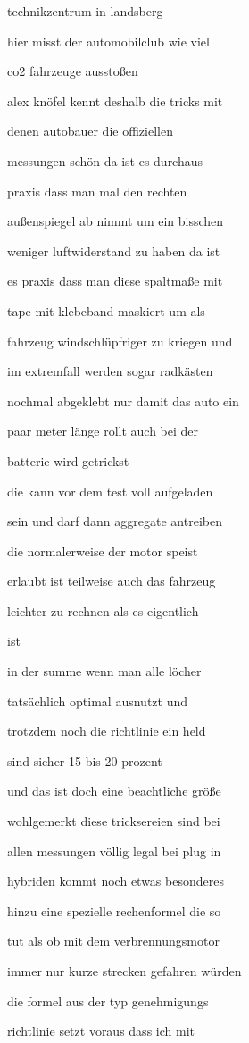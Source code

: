 \documentclass[a4paper, 11pt]{book} %
\begin{document}
technikzentrum in landsberg

hier misst der automobilclub wie viel

co2 fahrzeuge ausstoßen

alex knöfel kennt deshalb die tricks mit

denen autobauer die offiziellen

messungen schön da ist es durchaus

praxis dass man mal den rechten

außenspiegel ab nimmt um ein bisschen

weniger luftwiderstand zu haben da ist

es praxis dass man diese spaltmaße mit

tape mit klebeband maskiert um als

fahrzeug windschlüpfriger zu kriegen und

im extremfall werden sogar radkästen

nochmal abgeklebt nur damit das auto ein

paar meter länge rollt auch bei der

batterie wird getrickst

die kann vor dem test voll aufgeladen

sein und darf dann aggregate antreiben

die normalerweise der motor speist

erlaubt ist teilweise auch das fahrzeug

leichter zu rechnen als es eigentlich

ist

in der summe wenn man alle löcher

tatsächlich optimal ausnutzt und

trotzdem noch die richtlinie ein held

sind sicher 15 bis 20 prozent

und das ist doch eine beachtliche größe

wohlgemerkt diese tricksereien sind bei

allen messungen völlig legal bei plug in

hybriden kommt noch etwas besonderes

hinzu eine spezielle rechenformel die so

tut als ob mit dem verbrennungsmotor

immer nur kurze strecken gefahren würden

die formel aus der typ genehmigungs

richtlinie setzt voraus dass ich mit
\end{document}
